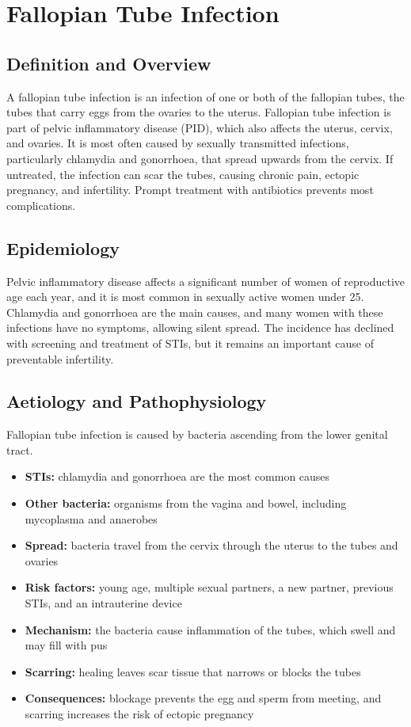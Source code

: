 \chapter{Fallopian Tube Infection}

\section*{Definition and Overview}
A fallopian tube infection is an infection of one or both of the fallopian tubes, the tubes that carry eggs from the ovaries to the uterus. Fallopian tube infection is part of pelvic inflammatory disease (PID), which also affects the uterus, cervix, and ovaries. It is most often caused by sexually transmitted infections, particularly chlamydia and gonorrhoea, that spread upwards from the cervix. If untreated, the infection can scar the tubes, causing chronic pain, ectopic pregnancy, and infertility. Prompt treatment with antibiotics prevents most complications.

\section*{Epidemiology}
Pelvic inflammatory disease affects a significant number of women of reproductive age each year, and it is most common in sexually active women under 25. Chlamydia and gonorrhoea are the main causes, and many women with these infections have no symptoms, allowing silent spread. The incidence has declined with screening and treatment of STIs, but it remains an important cause of preventable infertility.

\section*{Aetiology and Pathophysiology}
Fallopian tube infection is caused by bacteria ascending from the lower genital tract.
\begin{itemize}
    \item \textbf{STIs:} chlamydia and gonorrhoea are the most common causes
    \item \textbf{Other bacteria:} organisms from the vagina and bowel, including mycoplasma and anaerobes
    \item \textbf{Spread:} bacteria travel from the cervix through the uterus to the tubes and ovaries
    \item \textbf{Risk factors:} young age, multiple sexual partners, a new partner, previous STIs, and an intrauterine device
    \item \textbf{Mechanism:} the bacteria cause inflammation of the tubes, which swell and may fill with pus
    \item \textbf{Scarring:} healing leaves scar tissue that narrows or blocks the tubes
    \item \textbf{Consequences:} blockage prevents the egg and sperm from meeting, and scarring increases the risk of ectopic pregnancy
\end{itemize}


